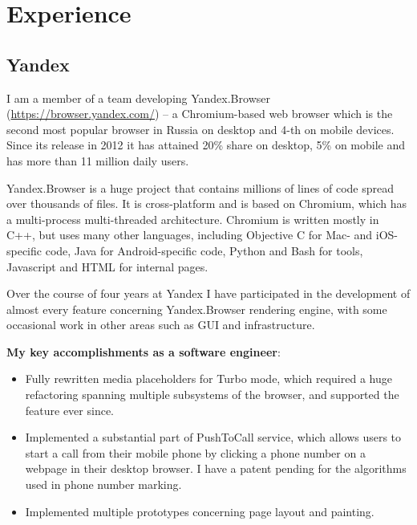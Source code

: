 \documentclass[11pt,a4paper]{moderncv}
\begin{document}
\makecvtitle

\section{Experience}
\subsection{Yandex}
  I am a member of a team developing Yandex.Browser (\url{https://browser.yandex.com/}) -- a Chromium-based web browser which is the second most popular browser in Russia on desktop and 4-th on mobile devices.
  Since its release in 2012 it has attained 20\% share on desktop, 5\% on mobile and has more than 11 million daily users.

  Yandex.Browser is a huge project that contains millions of lines of code spread over thousands of files. It is cross-platform and is based on Chromium, which has a multi-process multi-threaded architecture.
  Chromium is written mostly in C++, but uses many other languages, including Objective C for Mac- and iOS-specific code, Java for Android-specific code, Python and Bash for tools, Javascript and HTML for internal pages.

  Over the course of four years at Yandex I have participated in the development of almost every feature concerning Yandex.Browser rendering engine, with some occasional work in other areas such as GUI and infrastructure.

  \medskip
  \textbf{My key accomplishments as a software engineer}:
  \smallskip
  \begin{itemize}%
    \item Fully rewritten media placeholders for Turbo mode, which required a huge refactoring spanning multiple subsystems of the browser, and supported the feature ever since.
    \item Implemented a substantial part of PushToCall service, which allows users to start a call from their mobile phone by clicking a phone number on a webpage in their desktop browser.
      I have a patent pending for the algorithms used in phone number marking.
    \item Implemented multiple prototypes concerning page layout and painting.
  \end{itemize}
\end{document}

